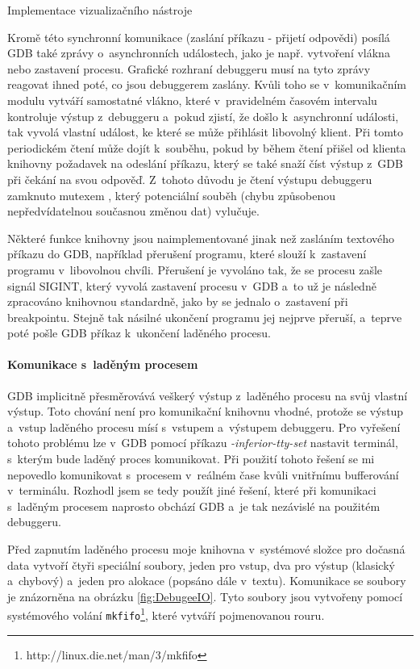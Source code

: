 \documentclass[czech,bachelor,male,python,dept460,hidelinks]{diploma}						%
\newcommand{\parspace}[1][]{
	\ifthenelse{\isempty{#1}}{\vspace{0mm}}{\vspace{#1}}
	\par
}
\begin{document}
\begin{section}{Implementace vizualizačního nástroje}
			\parspace Kromě této synchronní komunikace (zaslání příkazu - přijetí odpovědi) posílá GDB také zprávy o~asynchronních událostech, jako je např.
			vytvoření vlákna nebo zastavení procesu. Grafické rozhraní debuggeru musí na tyto zprávy reagovat ihned poté, co jsou debuggerem zaslány.
			Kvůli toho se v~komunikačním modulu vytváří samostatné vlákno, které v~pravidelném časovém intervalu kontroluje výstup z~debuggeru a~pokud zjistí, že došlo
			k~asynchronní události, tak vyvolá vlastní událost, ke které se může přihlásit libovolný klient. Při tomto periodickém čtení může dojít k~souběhu, pokud
			by během čtení přišel od klienta knihovny požadavek na odeslání příkazu, který se také snaží číst výstup z~GDB při čekání na svou odpověď.
			Z~tohoto důvodu je čtení výstupu debuggeru zamknuto mutexem \cite[80]{tanenbaum}, který potenciální souběh (chybu způsobenou nepředvídatelnou
			současnou změnou dat) vylučuje.
			
			\parspace Některé funkce knihovny jsou naimplementované jinak než zasláním textového příkazu do GDB, například přerušení programu, které
			slouží k~zastavení programu v~libovolnou chvíli. Přerušení je vyvoláno tak, že se procesu zašle signál SIGINT, který vyvolá zastavení procesu v~GDB a~to
			už je následně zpracováno knihovnou standardně, jako by se jednalo o~zastavení při breakpointu. Stejně tak násilné ukončení programu jej nejprve přeruší,
			a~teprve poté pošle GDB příkaz k~ukončení laděného procesu.
			
		\paragraph*{Komunikace s~laděným procesem}
			GDB implicitně přesměrovává veškerý výstup z~laděného procesu na svůj vlastní výstup. Toto chování není pro komunikační knihovnu vhodné,
			protože se výstup a~vstup laděného procesu mísí s~vstupem a~výstupem debuggeru.
			Pro vyřešení tohoto problému lze v~GDB pomocí příkazu \textit{-inferior-tty-set} nastavit terminál, s~kterým bude laděný proces komunikovat.
			Při použití tohoto řešení se mi nepovedlo komunikovat s~procesem v~reálném čase kvůli vnitřnímu bufferování v~terminálu.
			Rozhodl jsem se tedy použít jiné řešení, které při komunikaci s~laděným procesem naprosto obchází GDB a~je tak nezávislé na použitém debuggeru.
			
			\parspace Před zapnutím laděného procesu moje knihovna v~systémové složce pro dočasná data vytvoří čtyři speciální soubory, jeden pro vstup, dva pro výstup
			(klasický a~chybový) a~jeden pro alokace (popsáno dále v~textu). Komunikace se soubory je znázorněna na obrázku \ref{fig:DebugeeIO}.
			Tyto soubory jsou vytvořeny pomocí systémového volání \texttt{mkfifo}\footnote{http://linux.die.net/man/3/mkfifo}, které vytváří pojmenovanou rouru.
			

\end{section}
\end{document}
